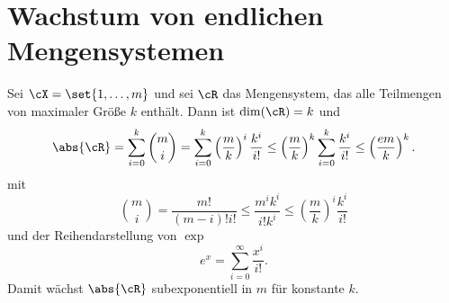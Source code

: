 \documentclass[language=ngerman,algolist,acrolist]{TemplateLecture}
\begin{document}
\section{Wachstum von endlichen Mengensystemen}
\begin{expl}\label{expl:setSystemSize}
    Sei $\cX = \set{1,\ldots,m}$ und sei $\cR$ das Mengensystem, das alle Teilmengen von maximaler Größe $k$ enthält. Dann ist $\dim(\cR) = k$ und 
    \begin{equation*}
        \abs{\cR} = \sum_{i = 0}^k \binom{m}{i} = \sum_{i = 0}^k \left( \frac{m}{k} \right)^i \frac{k^i}{i!} \leq \left(\frac{m}{k}\right)^k \sum_{i = 0}^k \frac{k^i}{i!} \leq \left( \frac{em}{k} \right)^k.
    \end{equation*}
    mit 
    \begin{equation*}
        \binom{m}{i} = \frac{m!}{(m-i)! i!} \leq \frac{m^i k^i}{i! k^i} \leq \left(\frac{m}{k}\right)^i\frac{k^i}{i!}
    \end{equation*}
    und der Reihendarstellung von $\exp$
    \begin{equation*}
        e^x = \sum_{i = 0}^\infty \frac{x^i}{i!}.
    \end{equation*}
    Damit wächst $\abs{\cR}$ subexponentiell in $m$ für konstante $k$.
\end{expl}
\end{document}
